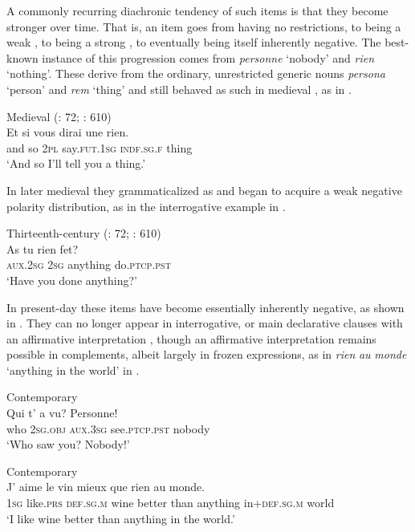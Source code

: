 \documentclass[output=paper]{langsci/langscibook}
\begin{document}
A commonly recurring diachronic tendency of such items is that they become stronger over time. That is, an item goes from having no restrictions, to being a weak , to being a strong , to eventually being itself inherently negative. The best-known instance of this progression comes from  \textit{personne} ‘nobody’ and \textit{rien} ‘nothing’. These derive from the ordinary, unrestricted  generic nouns \textit{persona} ‘person’ and \textit{rem} ‘thing’ and still behaved as such in medieval , as in .


\ea\label{med}
{       {Medieval}  (\citealt{Hansen2013}: 72; \citealt{Buridant2000}: 610)} \\
\gll Et si vous dirai une rien.\\
     and so \textsc{2pl} say.\textsc{fut.1sg} \textsc{indf.sg.f} thing\\
\glt ‘And so I’ll tell you a thing.’
\z

In later medieval  they grammaticalized as  and began to acquire a weak negative polarity distribution, as in the interrogative example in .

\ea\label{c13}
{Thirteenth-century  (\citealt{Hansen2013}: 72; \citealt{Buridant2000}: 610)} \\
\gll As tu rien fet?\\
     \textsc{aux.2sg} \textsc{2sg} anything do.\textsc{ptcp.pst}\\
\glt ‘Have you done anything?’
\z

In present-day  these items have become essentially inherently negative, as shown in . They can no longer appear in interrogative,  or main declarative clauses with an affirmative interpretation \citep[73]{Hansen2013}, though an affirmative interpretation remains possible in  complements, albeit largely in frozen expressions, as in \textit{rien} \textit{au} \textit{monde} ‘anything in the world’ in .

\ea\label{cont}
{       Contemporary  \citep[68]{Hansen2013}} \\
\gll Qui t’ a vu? Personne!\\
     who 2\textsc{sg.obj} \textsc{aux.3sg} see.\textsc{ptcp.pst} nobody\\
\glt ‘Who saw you? Nobody!’
\z

\ea\label{cont1}
{       Contemporary  \citep[73]{Hansen2013}} \\
\gll J’ aime le vin mieux que rien au monde.\\
     \textsc{1sg} like.\textsc{prs} \textsc{def.sg.m} wine better than anything in+\textsc{def.sg.m} world\\
\glt ‘I like wine better than anything in the world.’
\z
\end{document}
